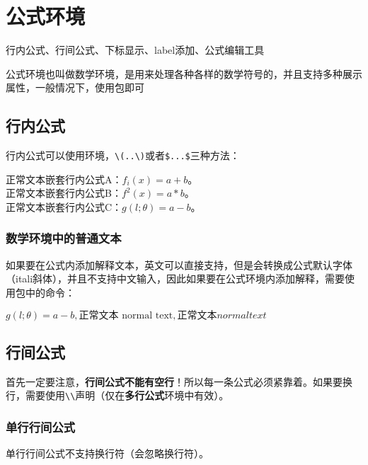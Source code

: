 \section{公式环境}\label{sec:公式}
    行内公式、行间公式、下标显示、label添加、公式编辑工具

    公式环境也叫做数学环境，是用来处理各种各样的数学符号的，并且支持多种展示属性，一般情况下，使用包即可
    

    \subsection{行内公式}
    行内公式可以使用环境，\verb|\(..\)|或者\verb|$...$|三种方法：

    \begin{texshow}
        正常文本嵌套行内公式A：\begin{math}f_i(x)=a+b\end{math}。\\
        正常文本嵌套行内公式B：\(f^2(x)=a*b\)。\\
        正常文本嵌套行内公式C：$g(l;\theta)=a-b$。
    \end{texshow}

    \subsubsection{数学环境中的普通文本}
    如果要在公式内添加解释文本，英文可以直接支持，但是会转换成公式默认字体（itali斜体），并且不支持中文输入，因此如果要在公式环境内添加解释，需要使用包中的命令：
    \begin{texshow}
        $g(l;\theta)=a-b,\text{正常文本 normal text},正常文本 normal text$
    \end{texshow}

    \subsection{行间公式}
    首先一定要注意，\textbf{行间公式不能有空行}！所以每一条公式必须紧靠着。如果要换行，需要使用\verb|\\|声明（仅在\textbf{多行公式}环境中有效）。
    
    \subsubsection{单行行间公式}
    单行行间公式不支持换行符（会忽略换行符）。

